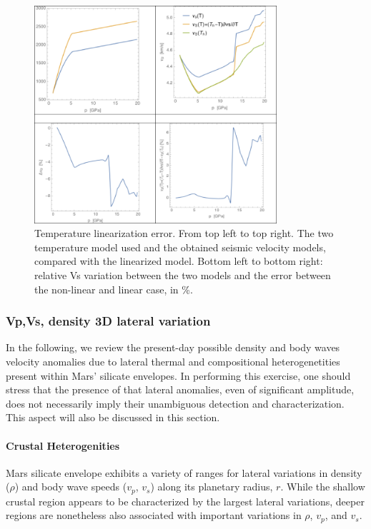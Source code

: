 \begin{figure}[h!]
\begin{center}
\includegraphics[width=0.8\textwidth]
{figures/Fig3-3-4_v2.png}
\caption{Temperature linearization error. From top left to top right. The two temperature model used and the obtained seismic velocity models, compared with the linearized model. Bottom left to bottom right: relative Vs variation between the two models and the error between the non-linear and linear case, in \%.}
\label{fig:Fig3-3-4.png} 
\end{center}
\end{figure}

\subsubsection{Vp,Vs, density 3D lateral variation}

In the following, we review the present-day possible density and body waves velocity anomalies due to lateral thermal and compositional heterogenetities present within Mars' silicate envelopes. In performing this exercise, one should stress that the presence of that lateral anomalies, even of significant amplitude, does not necessarily imply their unambiguous detection and characterization. This aspect will also be discussed in this section.  

\paragraph{Crustal Heterogenities}

Mars silicate envelope exhibits a variety of ranges for lateral variations in density ($\rho$) and body wave speeds ($v_p$, $v_s$) along its planetary radius, $r$. While the shallow crustal region appears to be characterized by the largest lateral variations, deeper regions are nonetheless also associated with important variations in $\rho$, $v_p$, and $v_s$.

